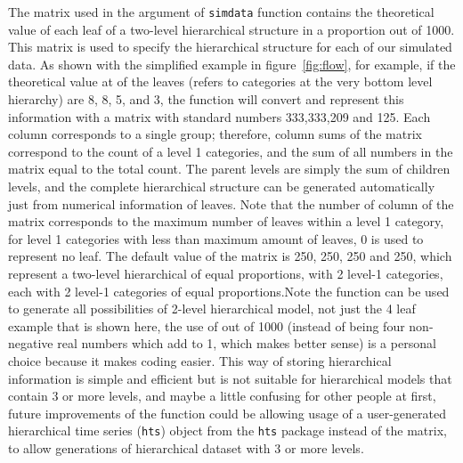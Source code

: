 \newpara

The matrix used in the argument of \texttt{simdata} function contains the theoretical value of each leaf of a two-level hierarchical structure in a proportion out of 1000. This matrix is used to specify the hierarchical structure for each of our simulated data. As shown with the simplified example in  figure~\ref{fig:flow}, for example, if the theoretical value at of the leaves (refers to categories at the very bottom level hierarchy) are 8, 8, 5, and 3, the function will convert and  represent this information with a matrix with standard numbers 333,333,209 and 125. Each column corresponds to a single group; therefore, column sums of the matrix correspond to the count of a level 1 categories, and the sum of all numbers in the matrix equal to the total count. The parent levels are simply the sum of children levels, and the complete hierarchical structure can be generated automatically just from numerical information of leaves. Note that the number of column of the matrix corresponds to the maximum number of leaves within a level 1 category, for level 1 categories with less than maximum amount of leaves, 0 is used to represent no leaf. The default value of the matrix is 250, 250, 250 and 250, which represent a two-level hierarchical of equal proportions, with 2 level-1 categories, each with 2 level-1 categories of equal proportions.Note the function can be used to generate all possibilities of 2-level hierarchical model, not just the 4 leaf example that is shown here, the use of out of 1000 (instead of being four non-negative real numbers which add to 1, which makes better sense) is a personal choice because it makes coding easier. This way of storing hierarchical information is simple and efficient but is not suitable for hierarchical models that contain 3 or more levels, and maybe a little confusing for other people at first, future improvements of the function could be allowing usage of a user-generated hierarchical time series (\texttt{hts}) object from the \texttt{hts} package instead of the matrix, to allow generations of  hierarchical dataset with  3 or more levels. 

\newpara 

